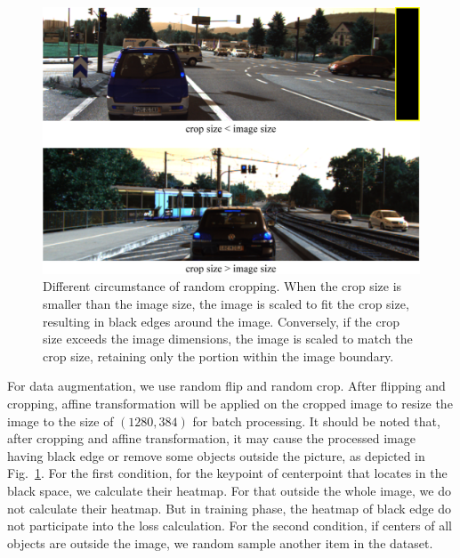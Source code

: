 \documentclass[journal]{IEEEtran}
\begin{document}
	
	\begin{figure}[!t]
		\centering
		\includegraphics[width=1.0\linewidth]{Figures/affine/affine.eps}
		\caption{Different circumstance of random cropping. When the crop size is smaller than the image size, the image is scaled to fit the crop size, resulting in black edges around the image. Conversely, if the crop size exceeds the image dimensions, the image is scaled to match the crop size, retaining only the portion within the image boundary.}
		\label{fig:affine trans}
	\end{figure}
	For data augmentation, we use random flip and random crop. After flipping and cropping, affine transformation will be applied on the cropped image to resize the image to the size of $(1280, 384)$ for batch processing. It should be noted that, after cropping and affine transformation, it may cause the processed image having black edge or remove some objects outside the picture, as depicted in Fig.~\ref{fig:affine trans}. For the first condition, for the keypoint of centerpoint that locates in the black space, we calculate their heatmap. For that outside the whole image, we do not calculate their heatmap. But in training phase, the heatmap of black edge do not participate into the loss calculation. For the second condition, if centers of all objects are outside the image, we random sample another item in the dataset.
	
\end{document}
